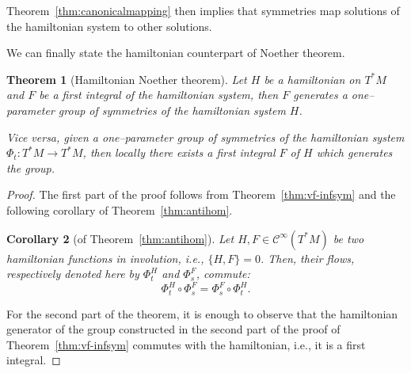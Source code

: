 \documentclass[english,fontsize=11pt,paper=b5]{scrbook}
\numberwithin{equation}{chapter}
\newtheorem{theorem}{Theorem}[chapter]
\newtheorem{corollary}[theorem]{Corollary}
\theoremstyle{definition}
\begin{document}
    Theorem~\ref{thm:canonicalmapping} then implies that symmetries map solutions of the hamiltonian system to other solutions.

    We can finally state the hamiltonian counterpart of Noether theorem.

    \begin{theorem}[Hamiltonian Noether theorem]
      Let $H$ be a hamiltonian on $T^*M$ and $F$ be a first integral of the hamiltonian system, then $F$ generates a one--parameter group of symmetries of the hamiltonian system $H$.

      Vice versa, given a one--parameter group of symmetries of the hamiltonian system $\Phi_t:T^*M\to T^* M$, then \emph{locally} there exists a first integral $F$ of $H$ which generates the group.
    \end{theorem}
    \begin{proof}
      The first part of the proof follows from Theorem~\ref{thm:vf-infsym} and the following corollary of Theorem~\ref{thm:antihom}.

      \begin{corollary}[of Theorem~\ref{thm:antihom}]
        Let $H, F \in \mathcal{C}^\infty(T^*M)$ be two hamiltonian functions in involution, i.e., $\{H,F\}=0$.
        Then, their flows, respectively denoted here by $\Phi_t^H$ and $\Phi_s^F$, commute:
        \begin{equation}
          \Phi_t^H \circ \Phi_s^F = \Phi_s^F \circ \Phi_t^H.
        \end{equation}
      \end{corollary}

      For the second part of the theorem, it is enough to observe that the hamiltonian generator of the group constructed in the second part of the proof of Theorem~\ref{thm:vf-infsym} commutes with the hamiltonian, i.e., it is a first integral.
    \end{proof}
\end{document}
